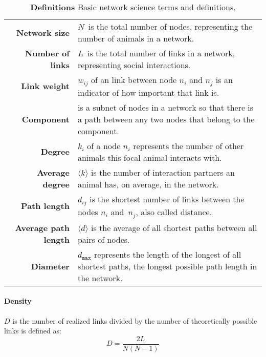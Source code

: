 \begin{table}[!tp]
\small
\caption[Definitions]{\textbf{Definitions} Basic network science terms and definitions.}
\label{tab:theory}
\vspace{3mm}
\colorbox{usethiscolorhere}{
\centering
\begin{tabularx}{\textwidth}{@{} r Y @{}}
	\textbf{Network size} &
	$N$~is the total number of nodes, representing the number of animals in a network.\vspace{2mm}\\
	\textbf{Number of links} &
	$L$~is the total number of links in a network, representing social interactions.\vspace{2mm}\\
	\textbf{Link weight} &
	$w_{ij}$ of an link between node $n_i$ and $n_j$ is an indicator of how important that link is.\vspace{2mm}\\
	\textbf{Component} &
	is a subnet of nodes in a network so that there is a path between any two nodes that belong to the component.\vspace{2mm}\\
	\textbf{Degree} &
	$k_i$ of a node $n_i$ represents the number of other animals this focal animal interacts with.\vspace{2mm}\\
	\textbf{Average degree} &
	$\langle k \rangle$ is the number of interaction partners an animal has, on average, in the network.\vspace{2mm}\\
	\textbf{Path length} & $d_{ij}$ is the shortest number of links between the nodes $n_i$ and~$n_j$, also called distance.\vspace{2mm}\\
	\textbf{Average path length} & $\langle d \rangle$ is the average of all shortest paths between all pairs of nodes.\vspace{2mm}\\
	\textbf{Diameter} & $d_{\texttt{max}}$ represents the length of the longest of all shortest paths, the longest possible path length in the network.\\
\end{tabularx}
}
\end{table}

\paragraph{Density} $D$ is the number of realized links divided by the number
of theoretically possible links is defined as: $$D=\frac{2L}{N(N-1)}$$


